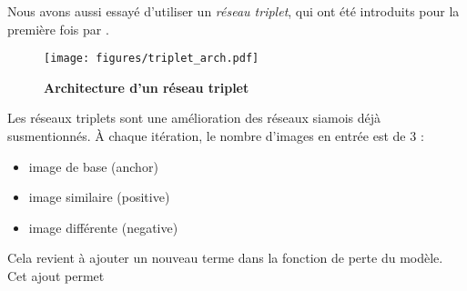 Nous avons aussi essayé d'utiliser un \textit{réseau triplet}, qui ont été introduits pour la première fois par
\cite{hoffer2014deep}.

\begin{figure}[ht]
    \center
    \texttt{[image: figures/triplet\_arch.pdf]}
    \caption{\label{fig:siamnet_arch} \textbf{Architecture d'un réseau triplet}}
\end{figure}

Les réseaux triplets sont une amélioration des réseaux siamois déjà susmentionnés. À chaque itération, le nombre
d'images en entrée est de 3 : 

\begin{itemize}
    \item image de base (anchor)
    \item image similaire (positive)
    \item image différente (negative)
\end{itemize}

Cela revient à ajouter un nouveau terme dans la fonction de perte du modèle. Cet ajout permet 
